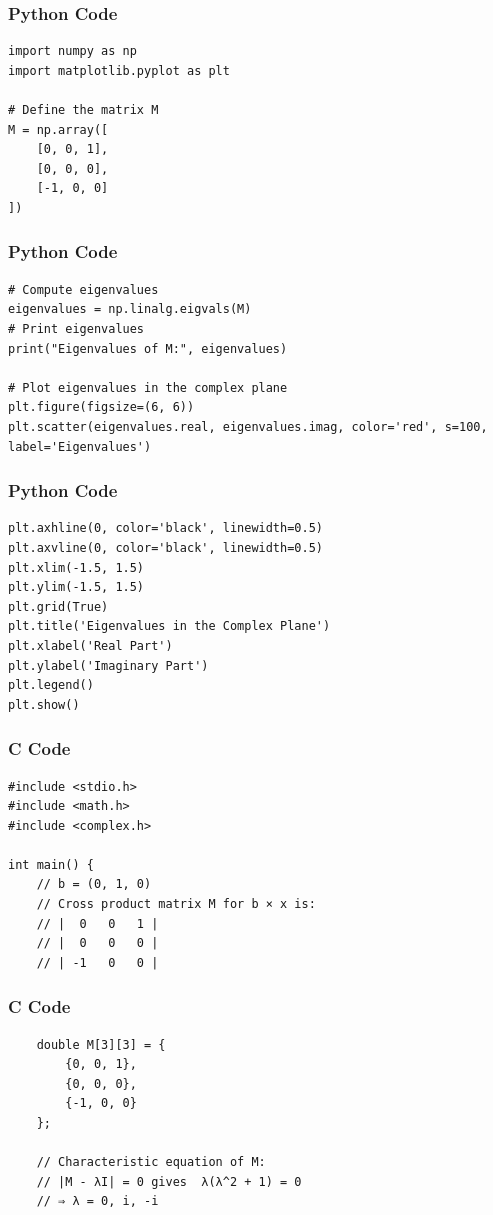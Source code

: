 \documentclass{beamer}
\begin{document}
\begin{frame}[fragile]
\frametitle{Python Code}
\begin{lstlisting}
import numpy as np
import matplotlib.pyplot as plt

# Define the matrix M
M = np.array([
    [0, 0, 1],
    [0, 0, 0],
    [-1, 0, 0]
])
\end{lstlisting}
\end{frame}

\begin{frame}[fragile]
\frametitle{Python Code}
\begin{lstlisting}
# Compute eigenvalues
eigenvalues = np.linalg.eigvals(M)
# Print eigenvalues
print("Eigenvalues of M:", eigenvalues)

# Plot eigenvalues in the complex plane
plt.figure(figsize=(6, 6))
plt.scatter(eigenvalues.real, eigenvalues.imag, color='red', s=100, label='Eigenvalues')
\end{lstlisting}
\end{frame}

\begin{frame}[fragile]
\frametitle{Python Code}
\begin{lstlisting}
plt.axhline(0, color='black', linewidth=0.5)
plt.axvline(0, color='black', linewidth=0.5)
plt.xlim(-1.5, 1.5)
plt.ylim(-1.5, 1.5)
plt.grid(True)
plt.title('Eigenvalues in the Complex Plane')
plt.xlabel('Real Part')
plt.ylabel('Imaginary Part')
plt.legend()
plt.show()
\end{lstlisting}
\end{frame}

\begin{frame}[fragile]
\frametitle{C Code}
\begin{lstlisting}
#include <stdio.h>
#include <math.h>
#include <complex.h>

int main() {
    // b = (0, 1, 0)
    // Cross product matrix M for b × x is:
    // |  0   0   1 |
    // |  0   0   0 |
    // | -1   0   0 |
\end{lstlisting}
\end{frame}

\begin{frame}[fragile]
\frametitle{C Code}
\begin{lstlisting}
    double M[3][3] = {
        {0, 0, 1},
        {0, 0, 0},
        {-1, 0, 0}
    };

    // Characteristic equation of M:
    // |M - λI| = 0 gives  λ(λ^2 + 1) = 0
    // ⇒ λ = 0, i, -i
\end{lstlisting}
\end{frame}
\end{document}
